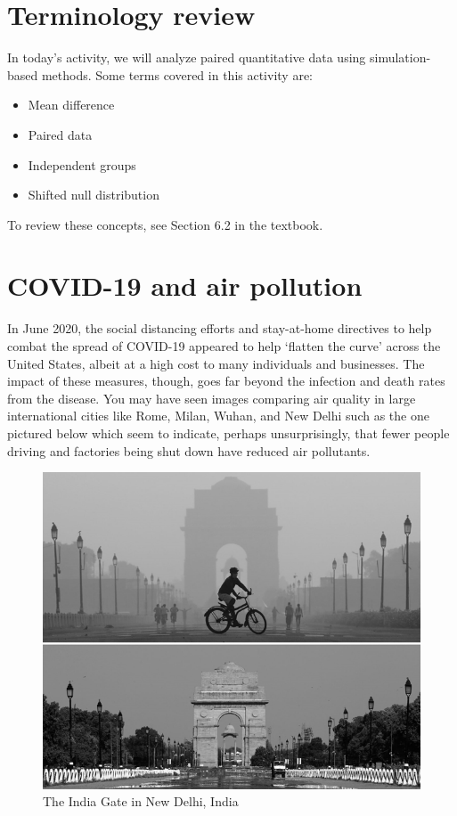 \documentclass[
]{report}
\begin{document}
\hypertarget{terminology-review}{%
\section{Terminology review}\label{terminology-review}}

In today's activity, we will analyze paired quantitative data using simulation-based methods. Some terms covered in this activity are:

\begin{itemize}
\item
  Mean difference
\item
  Paired data
\item
  Independent groups
\item
  Shifted null distribution
\end{itemize}

To review these concepts, see Section 6.2 in the textbook.

\hypertarget{covid-19-and-air-pollution-1}{%
\section{COVID-19 and air pollution}\label{covid-19-and-air-pollution-1}}

In June 2020, the social distancing efforts and stay-at-home directives to help combat the spread of COVID-19 appeared to help `flatten the curve' across the United States, albeit at a high cost to many individuals and businesses. The impact of these measures, though, goes far beyond the infection and death rates from the disease. You may have seen images comparing air quality in large international cities like Rome, Milan, Wuhan, and New Delhi such as the one pictured below which seem to indicate, perhaps unsurprisingly, that fewer people driving and factories being shut down have reduced air pollutants.

\begin{figure}

{\centering \includegraphics[width=0.6\linewidth]{images/air_pollution_greyscale} 

}

\caption{The India Gate in New Delhi, India}\label{fig:unnamed-chunk-1}
\end{figure}
\end{document}
